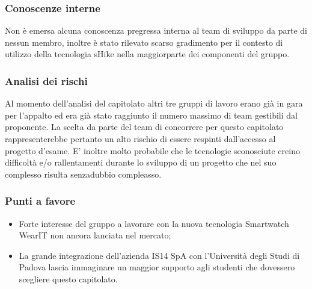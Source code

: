   \subsubsection{Conoscenze interne}
  Non è emersa alcuna conoscenza pregressa interna al team di sviluppo da parte di nessun membro, inoltre è stato rilevato scarso gradimento per il contesto di utilizzo della tecnologia sHike nella maggiorparte dei componenti del gruppo.
  \subsubsection{Analisi dei rischi}
  Al momento dell'analisi del capitolato altri tre gruppi di lavoro erano già in gara per l'appalto ed era già stato raggiunto il numero massimo di team gestibili dal proponente. La scelta da parte del team di concorrere per questo capitolato rappresenterebbe pertanto un alto rischio di essere respinti dall'accesso al progetto d'esame. E' inoltre molto probabile che le tecnologie sconosciute creino difficoltà e/o rallentamenti durante lo sviluppo di un progetto che nel suo complesso risulta senzadubbio compleasso.
  \subsubsection{Punti a favore}
  \begin{itemize}
     \item Forte interesse del gruppo a lavorare con la nuova tecnologia Smartwatch WearIT non ancora lanciata nel mercato;
     \item La grande integrazione dell'azienda IS14 SpA con l'Università degli Studi di Padova lascia immaginare un maggior supporto agli studenti che dovessero scegliere questo capitolato.
  \end{itemize}